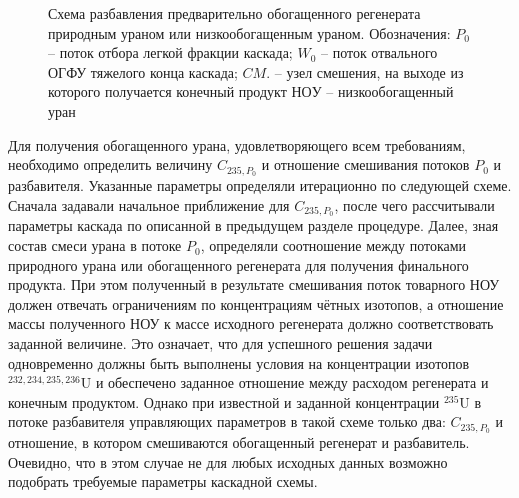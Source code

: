 \begin{figure}[ht]
  \caption{Схема разбавления предварительно обогащенного регенерата природным ураном или низкообогащенным ураном. Обозначения: $P_0$ -- поток отбора легкой фракции каскада; $W_0$ -- поток отвального ОГФУ тяжелого конца каскада; $CM.$ -- узел смешения, на выходе из которого получается конечный продукт $НОУ$ -- низкообогащенный уран}\label{o1}
\end{figure}

Для получения обогащенного урана, удовлетворяющего всем требованиям, необходимо определить величину $C_{235, P_0}$ и отношение смешивания потоков $P_0$ и разбавителя. Указанные параметры определяли итерационно по следующей схеме. Сначала задавали начальное приближение для  $C_{235, P_0}$, после чего рассчитывали параметры каскада по описанной в предыдущем разделе процедуре. Далее, зная состав смеси урана в потоке $P_0$, определяли соотношение между потоками природного урана или обогащенного регенерата для получения финального продукта. При этом полученный в результате смешивания поток товарного НОУ должен отвечать ограничениям по концентрациям чётных изотопов, а отношение массы полученного НОУ к массе исходного регенерата должно соответствовать заданной величине. Это означает, что для успешного решения задачи одновременно должны быть выполнены условия на концентрации изотопов $^{232,234,235,236}$U и обеспечено заданное отношение между расходом регенерата и конечным продуктом. Однако при известной и заданной концентрации $^{235}$U в потоке разбавителя управляющих параметров в такой схеме только два: $C_{235, P_0}$ и отношение, в котором смешиваются обогащенный регенерат и разбавитель. Очевидно, что в этом случае не для любых исходных данных возможно подобрать требуемые параметры каскадной схемы.

